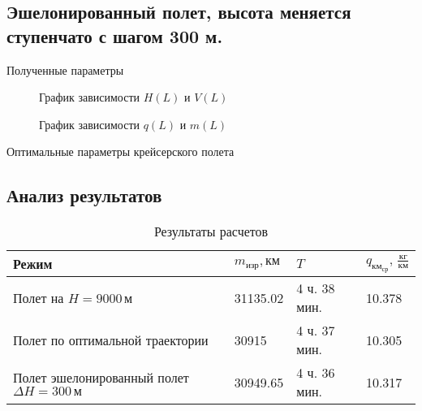 \subsection{Эшелонированный полет, высота меняется ступенчато с шагом 300 м.}

\begin{table}[H]
    \centering
    \caption{Полученные параметры}
    \label{tab:H_300_V_opt}
    
\end{table}

\begin{figure}[H]
    \begin{minipage}{0.49\textwidth}
    \centering
    \resizebox{\textwidth}{!}{}
    \caption{График зависимости $H(L)$ и $V(L)$}
    \label{fig:FL_H_V_opt}
    \end{minipage}
    \hfill
    \begin{minipage}{0.49\textwidth}
    \centering
    \resizebox{\textwidth}{!}{}
    \caption{График зависимости $q(L)$ и $m(L)$}
    \label{fig:H_300_L_m}
    \end{minipage}
\end{figure}

\begin{table}[H]
\centering
\resizebox{\textwidth-1.4cm}{!}{
    
}
\caption{Оптимальные параметры крейсерского полета}
\label{t:1}
\end{table}


\subsection{Анализ результатов}
\begin{table}[H]
\centering
\caption{Результаты расчетов}
\label{tab:tab:opt_vs_const_h}
\begin{tabular}{|p{}|p{}|p{}|p{}|}
\hline
Режим & $m_{изр}, км$ & $T$ & $q_{км_{ср}}, \, \frac{кг}{км}$\\
\hline
Полет на $H=9000\,м$ & 31135.02 & 4 ч. 38 мин. & 10.378\\
\hline
Полет по оптимальной траектории & 30915 & 4 ч. 37 мин. & 10.305\\
\hline
Полет эшелонированный полет $\Delta H =300\, м$ & 30949.65 & 4 ч. 36 мин. & 10.317\\
\hline
\end{tabular}
\end{table}

